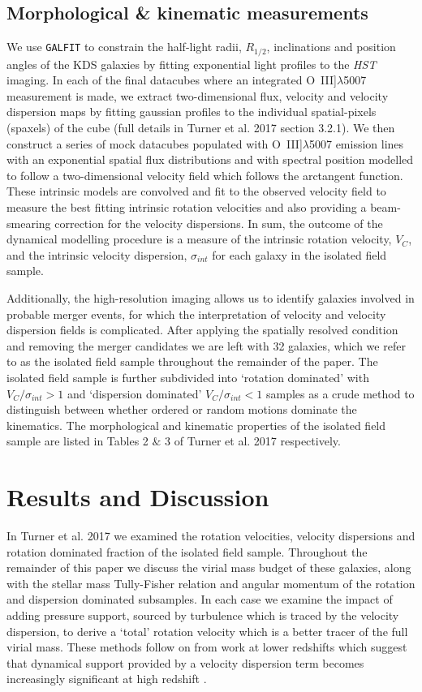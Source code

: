 \documentclass[a4paper,fleqn,usenatbib]{mn2e}
\begin{document}
\subsection{Morphological \& kinematic measurements}\label{subsec:measurements}
We use {\tt GALFIT} \citep{Peng2010_galfit} to constrain the half-light radii, $R_{1/2}$, inclinations and position angles of the KDS galaxies by fitting exponential light profiles to the {\it HST} imaging.
In each of the final datacubes where an integrated O~{\sc III}]$\lambda$5007 measurement is made, we extract two-dimensional flux, velocity and velocity dispersion maps by fitting gaussian profiles to the individual spatial-pixels (spaxels) of the cube (full details in Turner et al. 2017 section 3.2.1).
We then construct a series of mock datacubes populated with O~{\sc III}]$\lambda$5007 emission lines with an exponential spatial flux distributions and with spectral position modelled to follow a two-dimensional velocity field which follows the arctangent function.
These intrinsic models are convolved and fit to the observed velocity field to measure the best fitting intrinsic rotation velocities and also providing a beam-smearing correction for the velocity dispersions.
In sum, the outcome of the dynamical modelling procedure is a measure of the intrinsic rotation velocity, $V_{C}$, and the intrinsic velocity dispersion, $\sigma_{int}$ for each galaxy in the isolated field sample. 

Additionally, the high-resolution imaging allows us to identify galaxies involved in probable merger events, for which the interpretation of velocity and velocity dispersion fields is complicated.
After applying the spatially resolved condition and removing the merger candidates we are left with 32 galaxies, which we refer to as the isolated field sample throughout the remainder of the paper.
The isolated field sample is further subdivided into `rotation dominated' with $V_{C}/\sigma_{int} > 1$ and `dispersion dominated' $V_{C}/\sigma_{int} < 1$ samples as a crude method to distinguish between whether ordered or random motions dominate the kinematics.
The morphological and kinematic properties of the isolated field sample are listed in Tables 2 $\&$ 3 of Turner et al. 2017 respectively.

\section{Results and Discussion}\label{sec:results}
In Turner et al. 2017 we examined the rotation velocities, velocity dispersions and rotation dominated fraction of the isolated field sample.
Throughout the remainder of this paper we discuss the virial mass budget of these galaxies, along with the stellar mass Tully-Fisher relation and angular momentum of the rotation and dispersion dominated subsamples.
In each case we examine the impact of adding pressure support, sourced by turbulence which is traced by the velocity dispersion, to derive a `total' rotation velocity which is a better tracer of the full virial mass.
These methods follow on from work at lower redshifts which suggest that dynamical support provided by a velocity dispersion term becomes increasingly significant at high redshift \citep[e.g.][]{Burkert2010,Newman2013,Wuyts2016b,Ubler2017}.  
\end{document}
